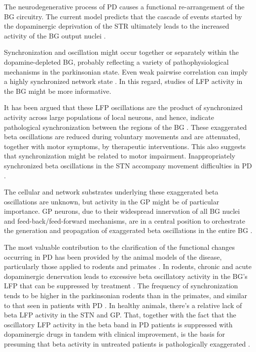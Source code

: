 \documentclass{article}
\begin{document}
The neurodegenerative process of PD causes a functional re-arrangement of the BG circuitry. The current model predicts that the cascade of events started by the dopaminergic deprivation of the STR ultimately leads to the increased activity of the BG output nuclei \citep{Cagnan}. 

Synchronization and oscillation might occur together or separately within the dopamine-depleted BG, probably reflecting a variety of pathophysiological mechanisms in the parkinsonian state. Even weak pairwise correlation can imply a highly synchronized network state \citep{Hammond}. In this regard, studies of LFP activity in the BG might be more informative.

It has been argued that these LFP oscillations are the product of synchronized activity across large populations of local neurons, and hence, indicate pathological synchronization between the regions of the BG \citep{Hammond}.
These exaggerated beta oscillations are reduced during voluntary movements and are attenuated, together with motor symptoms, by therapeutic interventions. This also suggests that synchronization might be related to motor impairment. Inappropriately synchronized beta oscillations in the STN accompany movement difficulties in PD \citep{Cagnan}. 

The cellular and network substrates underlying these exaggerated beta oscillations are unknown, but activity in the GP might be of particular importance. GP neurons, due to their widespread innervation of all BG nuclei and feed-back/feed-forward mechanisms, are in a central position to orchestrate the generation and propagation of exaggerated beta oscillations in the entire BG \citep{Cagnan}. 

The most valuable contribution to the clarification of the functional changes occurring in PD has been provided by the animal models of the disease, particularly those applied to rodents and primates \citep{Mallet}.
In rodents, chronic and acute dopaminergic denervation leads to excessive beta oscillatory activity in the BG’s LFP that can be suppressed by treatment \citep{Mallet}. The frequency of synchronization tends to be higher in the parkinsonian rodents than in the primates, and similar to that seen in patients with PD \citep{Hammond}.
In healthy animals, there’s a relative lack of beta LFP activity in the STN and GP. That, together with the fact that the oscillatory LFP activity in the beta band in PD patients is suppressed with dopaminergic drugs in tandem with clinical improvement, is the basis for presuming that beta activity in untreated patients is pathologically exaggerated \citep{Mallet}.
\end{document}
